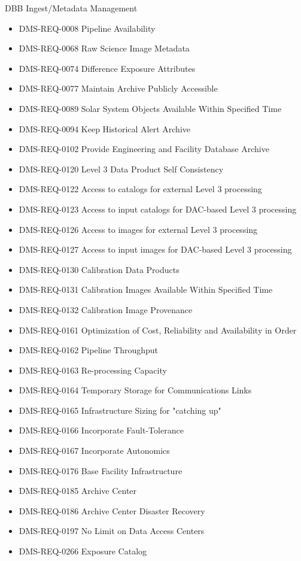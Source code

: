 DBB Ingest/Metadata Management \begin{itemize}
\item DMS-REQ-0008 Pipeline Availability
\item DMS-REQ-0068 Raw Science Image Metadata
\item DMS-REQ-0074 Difference Exposure Attributes
\item DMS-REQ-0077 Maintain Archive Publicly Accessible
\item DMS-REQ-0089 Solar System Objects Available Within Specified Time
\item DMS-REQ-0094 Keep Historical Alert Archive
\item DMS-REQ-0102 Provide Engineering and Facility Database Archive
\item DMS-REQ-0120 Level 3 Data Product Self Consistency
\item DMS-REQ-0122 Access to catalogs for external Level 3 processing
\item DMS-REQ-0123 Access to input catalogs for DAC-based Level 3 processing
\item DMS-REQ-0126 Access to images for external Level 3 processing
\item DMS-REQ-0127 Access to input images for DAC-based Level 3 processing
\item DMS-REQ-0130 Calibration Data Products
\item DMS-REQ-0131 Calibration Images Available Within Specified Time
\item DMS-REQ-0132 Calibration Image Provenance
\item DMS-REQ-0161 Optimization of Cost, Reliability and Availability in Order
\item DMS-REQ-0162 Pipeline Throughput
\item DMS-REQ-0163 Re-processing Capacity
\item DMS-REQ-0164 Temporary Storage for Communications Links
\item DMS-REQ-0165 Infrastructure Sizing for "catching up"
\item DMS-REQ-0166 Incorporate Fault-Tolerance
\item DMS-REQ-0167 Incorporate Autonomics
\item DMS-REQ-0176 Base Facility Infrastructure
\item DMS-REQ-0185 Archive Center
\item DMS-REQ-0186 Archive Center Disaster Recovery
\item DMS-REQ-0197 No Limit on Data Access Centers
\item DMS-REQ-0266 Exposure Catalog

\end{itemize}
